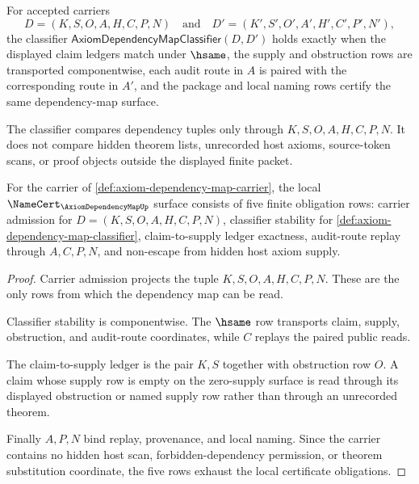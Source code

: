 \begin{definition}
\label{def:axiom-dependency-map-classifier}
For accepted carriers
$$
D=(K,S,O,A,H,C,P,N)
\quad\text{and}\quad
D'=(K',S',O',A',H',C',P',N'),
$$
the classifier $\mathsf{AxiomDependencyMapClassifier}(D,D')$ holds exactly when the displayed claim ledgers match under $\hsame$, the supply and obstruction rows are transported componentwise, each audit route in $A$ is paired with the corresponding route in $A'$, and the package and local naming rows certify the same dependency-map surface.

The classifier compares dependency tuples only through $K,S,O,A,H,C,P,N$. It does not compare hidden theorem lists, unrecorded host axioms, source-token scans, or proof objects outside the displayed finite packet.
\end{definition}

\begin{theorem}
\label{thm:axiom-dependency-map-namecert-obligations}
For the carrier of \autoref{def:axiom-dependency-map-carrier}, the local $\NameCert_{\AxiomDependencyMapUp}$ surface consists of five finite obligation rows: carrier admission for $D=(K,S,O,A,H,C,P,N)$, classifier stability for \autoref{def:axiom-dependency-map-classifier}, claim-to-supply ledger exactness, audit-route replay through $A,C,P,N$, and non-escape from hidden host axiom supply.
\end{theorem}
\begin{proof}
Carrier admission projects the tuple $K,S,O,A,H,C,P,N$. These are the only rows from which the dependency map can be read.

Classifier stability is componentwise. The $\hsame$ row transports claim, supply, obstruction, and audit-route coordinates, while $C$ replays the paired public reads.

The claim-to-supply ledger is the pair $K,S$ together with obstruction row $O$. A claim whose supply row is empty on the zero-supply surface is read through its displayed obstruction or named supply row rather than through an unrecorded theorem.

Finally $A,P,N$ bind replay, provenance, and local naming. Since the carrier contains no hidden host scan, forbidden-dependency permission, or theorem substitution coordinate, the five rows exhaust the local certificate obligations.
\end{proof}

